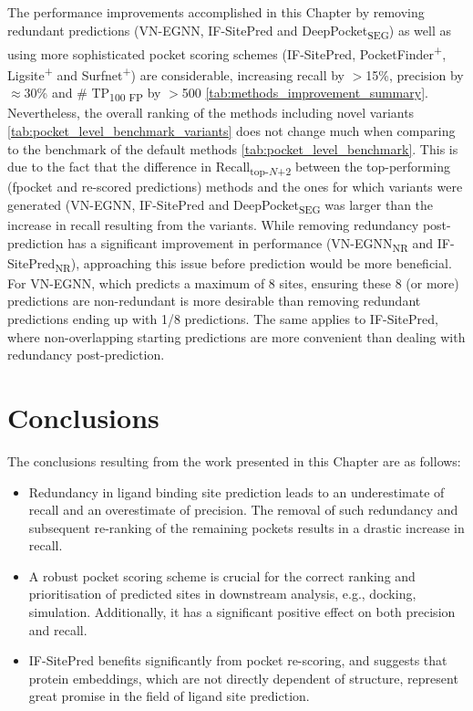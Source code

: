 The performance improvements accomplished in this Chapter by removing redundant predictions (VN-EGNN, IF-SitePred and DeepPocket\textsubscript{SEG}) as well as using more sophisticated pocket scoring schemes (IF-SitePred, PocketFinder\textsuperscript{+}, Ligsite\textsuperscript{+} and Surfnet\textsuperscript{+}) are considerable, increasing recall by $>$15\%, precision by $\approx$30\% and \# TP\textsubscript{100 FP} by $>$500 \autoref{tab:methods_improvement_summary}. Nevertheless, the overall ranking of the methods including novel variants \autoref{tab:pocket_level_benchmark_variants} does not change much when comparing to the benchmark of the default methods \autoref{tab:pocket_level_benchmark}. This is due to the fact that the difference in Recall\textsubscript{top-$N$+2} between the top-performing (fpocket and re-scored predictions) methods and the ones for which variants were generated (VN-EGNN, IF-SitePred and DeepPocket\textsubscript{SEG} was larger than the increase in recall resulting from the variants. While removing redundancy post-prediction has a significant improvement in performance (VN-EGNN\textsubscript{NR} and IF-SitePred\textsubscript{NR}), approaching this issue before prediction would be more beneficial. For VN-EGNN, which predicts a maximum of 8 sites, ensuring these 8 (or more) predictions are non-redundant is more desirable than removing redundant predictions ending up with 1/8 predictions. The same applies to IF-SitePred, where non-overlapping starting predictions are more convenient than dealing with redundancy post-prediction.

\section{Conclusions}

The conclusions resulting from the work presented in this Chapter are as follows:

\begin{itemize}

\item Redundancy in ligand binding site prediction leads to an underestimate of recall and an overestimate of precision. The removal of such redundancy and subsequent re-ranking of the remaining pockets results in a drastic increase in recall.

\item A robust pocket scoring scheme is crucial for the correct ranking and prioritisation of predicted sites in downstream analysis, e.g., docking, simulation. Additionally, it has a significant positive effect on both precision and recall.

\item IF-SitePred benefits significantly from pocket re-scoring, and suggests that protein embeddings, which are not directly dependent of structure, represent great promise in the field of ligand site prediction.

\end{itemize}


